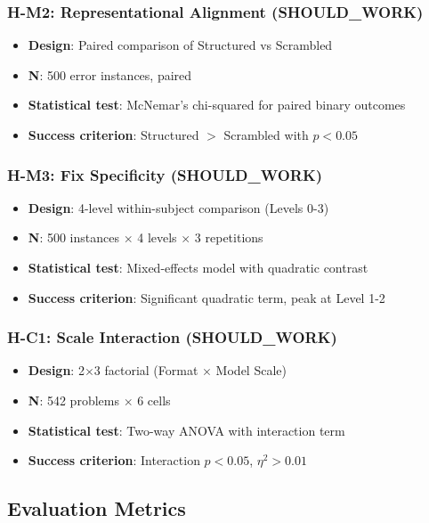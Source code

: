 \subsubsection{H-M2: Representational Alignment (SHOULD\_WORK)}
\begin{itemize}
    \item \textbf{Design}: Paired comparison of Structured vs Scrambled
    \item \textbf{N}: 500 error instances, paired
    \item \textbf{Statistical test}: McNemar's chi-squared for paired binary outcomes
    \item \textbf{Success criterion}: Structured $>$ Scrambled with $p < 0.05$
\end{itemize}

\subsubsection{H-M3: Fix Specificity (SHOULD\_WORK)}
\begin{itemize}
    \item \textbf{Design}: 4-level within-subject comparison (Levels 0-3)
    \item \textbf{N}: 500 instances $\times$ 4 levels $\times$ 3 repetitions
    \item \textbf{Statistical test}: Mixed-effects model with quadratic contrast
    \item \textbf{Success criterion}: Significant quadratic term, peak at Level 1-2
\end{itemize}

\subsubsection{H-C1: Scale Interaction (SHOULD\_WORK)}
\begin{itemize}
    \item \textbf{Design}: 2$\times$3 factorial (Format $\times$ Model Scale)
    \item \textbf{N}: 542 problems $\times$ 6 cells
    \item \textbf{Statistical test}: Two-way ANOVA with interaction term
    \item \textbf{Success criterion}: Interaction $p < 0.05$, $\eta^2 > 0.01$
\end{itemize}

\subsection{Evaluation Metrics}

